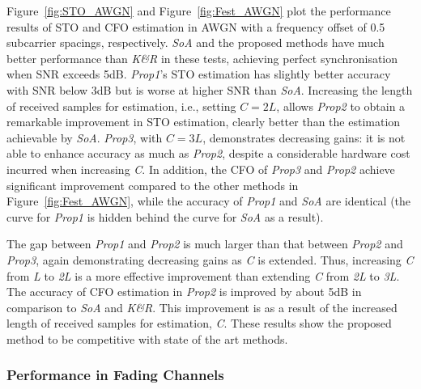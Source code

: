 Figure~\ref{fig:STO_AWGN} and  Figure~\ref{fig:Fest_AWGN} plot the performance results of STO and CFO estimation in AWGN with a frequency offset of 0.5 subcarrier spacings, respectively.
\textit{SoA} and the proposed methods have much better performance than \textit{K\&R} in these tests, achieving perfect synchronisation when SNR exceeds 5{\thinspace}dB.
\textit{Prop1}'s STO estimation has slightly better accuracy with SNR below 3{\thinspace}dB but is worse at higher SNR than \textit{SoA}.
Increasing the length of received samples for estimation, i.e., setting $C = 2L$, allows \textit{Prop2} to obtain a remarkable improvement in STO estimation, clearly better than the estimation achievable by \textit{SoA}.
\textit{Prop3}, with $C = 3L$, demonstrates decreasing gains: it is not able to enhance accuracy as much as \textit{Prop2}, despite a considerable hardware cost incurred when increasing \emph{C}.
In addition, the CFO of \textit{Prop3} and \textit{Prop2} achieve significant improvement compared to the other methods in Figure~\ref{fig:Fest_AWGN}, while the accuracy of \textit{Prop1} and \textit{SoA} are identical (the curve for \textit{Prop1} is hidden behind the curve for \textit{SoA} as a result).

The gap between \textit{Prop1} and \textit{Prop2} is much larger than that between \textit{Prop2} and \textit{Prop3}, again demonstrating decreasing gains as \emph{C} is extended. Thus, increasing \emph{C} from \emph{L} to \emph{2L} is a more effective improvement than extending \emph{C} from \emph{2L} to \emph{3L}.
The accuracy of CFO estimation in \textit{Prop2} is improved by about 5{\thinspace}dB in comparison to \textit{SoA} and \textit{K\&R}.
This improvement is as a result of the increased length of received samples for estimation, \textit{C}.
These results show the proposed method to be competitive with state of the art methods.

\subsubsection{Performance in Fading Channels}

